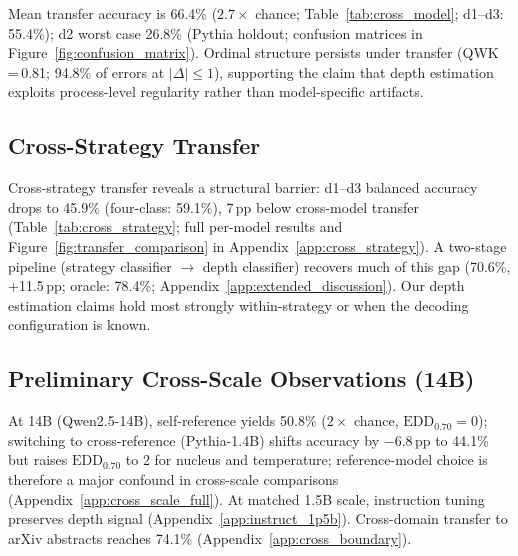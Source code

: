 Mean transfer accuracy is 66.4\% ($2.7{\times}$ chance; Table~\ref{tab:cross_model}; d1--d3: 55.4\%); d2 worst case 26.8\% (Pythia holdout; confusion matrices in Figure~\ref{fig:confusion_matrix}).
Ordinal structure persists under transfer (QWK\,=\,0.81; 94.8\% of errors at $|\Delta| \leq 1$), supporting the claim that depth estimation exploits process-level regularity rather than model-specific artifacts.

\subsection{Cross-Strategy Transfer}
\label{sec:gen:crossstrategy}

Cross-strategy transfer reveals a structural barrier: d1--d3 balanced accuracy drops to 45.9\% (four-class: 59.1\%), 7\,pp below cross-model transfer (Table~\ref{tab:cross_strategy}; full per-model results and Figure~\ref{fig:transfer_comparison} in Appendix~\ref{app:cross_strategy}).
A two-stage pipeline (strategy classifier $\to$ depth classifier) recovers much of this gap (70.6\%, $+$11.5\,pp; oracle: 78.4\%; Appendix~\ref{app:extended_discussion}).
Our depth estimation claims hold most strongly within-strategy or when the decoding configuration is known.

\subsection{Preliminary Cross-Scale Observations (14B)}
\label{sec:gen:crossscale}

At 14B (Qwen2.5-14B), self-reference yields 50.8\% ($2{\times}$ chance, $\mathrm{EDD}_{0.70}{=}0$); switching to cross-reference (Pythia-1.4B) shifts accuracy by $-$6.8\,pp to 44.1\% but raises $\mathrm{EDD}_{0.70}$ to 2 for nucleus and temperature; reference-model choice is therefore a major confound in cross-scale comparisons (Appendix~\ref{app:cross_scale_full}).
At matched 1.5B scale, instruction tuning preserves depth signal (Appendix~\ref{app:instruct_1p5b}).
Cross-domain transfer to arXiv abstracts reaches 74.1\% (Appendix~\ref{app:cross_boundary}).

